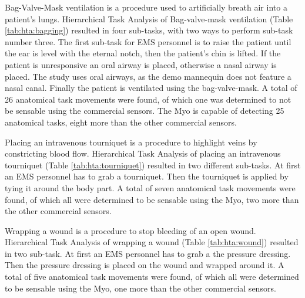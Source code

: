\par Bag-Valve-Mask ventilation is a procedure used to artificially breath air into a patient's lungs. Hierarchical Task Analysis of Bag-valve-mask ventilation (Table \ref{tab:hta:bagging}) resulted in four sub-tasks, with two ways to perform sub-task number three. The first sub-task for EMS personnel is to raise the patient until the ear is level with the eternal notch, then the patient's chin is lifted. If the patient is unresponsive an oral airway is placed, otherwise a nasal airway is placed. The study uses oral airways, as the demo mannequin does not feature a nasal canal. Finally the patient is ventilated using the bag-valve-mask. A total of 26 anatomical task movements were found, of which one was determined to not be sensable using the commercial sensors. The Myo is capable of detecting 25 anatomical tasks, eight more than the other commercial sensors.
\par Placing an intravenous tourniquet is a procedure to highlight veins by constricting blood flow. Hierarchical Task Analysis of placing an intravenous tourniquet (Table \ref{tab:hta:tourniquet}) resulted in two different sub-tasks. At first an EMS personnel has to grab a tourniquet. Then the tourniquet is applied by tying it around the body part. A total of seven anatomical task movements were found, of which all were determined to be sensable using the Myo, two more than the other commercial sensors.
\par Wrapping a wound is a procedure to stop bleeding of an open wound. Hierarchical Task Analysis of wrapping a wound (Table \ref{tab:hta:wound}) resulted in two sub-task. At first an EMS personnel has to grab a the pressure dressing. Then the pressure dressing is placed on the wound and wrapped around it. A total of five anatomical task movements were found, of which all were determined to be sensable using the Myo, one more than the other commercial sensors.
\newcommand*\rot{\multicolumn{1}{R{45}{1em}}}
